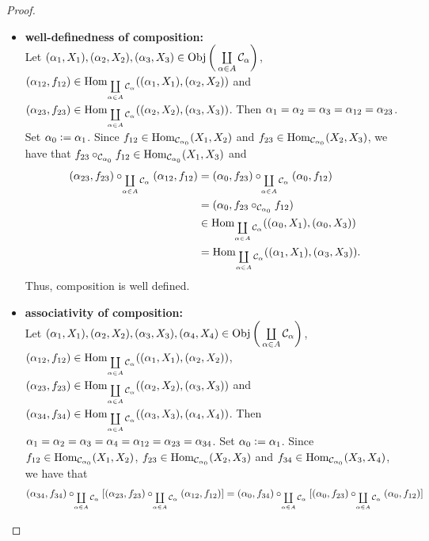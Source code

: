 \documentclass{book}
\begin{document}
	\begin{proof}\
		\begin{itemize}
			\item \textbf{well-definedness of composition: } \\ 
			Let $(\alpha_1, X_1), (\alpha_2, X_2), (\alpha_3, X_3) \in \operatorname{Obj} \bigg( \coprod\limits_{\alpha \in A} \mathcal{C}_{\alpha} \bigg)$, $(\alpha_{12}, f_{12}) \in \operatorname{Hom}_{\coprod\limits_{\alpha \in A} \mathcal{C}_{\alpha}}((\alpha_1, X_1), (\alpha_2, X_2))$ and $(\alpha_{23}, f_{23}) \in \operatorname{Hom}_{\coprod\limits_{\alpha \in A} \mathcal{C}_{\alpha}}((\alpha_2, X_2), (\alpha_3, X_3))$. Then $\alpha_1 = \alpha_2 = \alpha_3 = \alpha_{12} = \alpha_{23}$. Set $\alpha_0 \vcentcolon= \alpha_1$. Since $f_{12} \in \operatorname{Hom}_{\mathcal{C}_{\alpha_0}}(X_1, X_2)$ and $f_{23} \in \operatorname{Hom}_{\mathcal{C}_{\alpha_0}}(X_2, X_3)$, we have that $f_{23} \circ_{\mathcal{C}_{\alpha_0}} f_{12} \in \operatorname{Hom}_{\mathcal{C}_{\alpha_0}}(X_1, X_3)$ and
			\begin{align*}
				(\alpha_{23}, f_{23}) \circ_{\coprod\limits_{\alpha \in A} \mathcal{C}_{\alpha}} (\alpha_{12}, f_{12})
				& = (\alpha_0, f_{23}) \circ_{\coprod\limits_{\alpha \in A} \mathcal{C}_{\alpha}} (\alpha_0, f_{12}) \\
				& = (\alpha_0, f_{23} \circ_{\mathcal{C}_{\alpha_0}} f_{12}) \\
				& \in \operatorname{Hom}_{\coprod\limits_{\alpha \in A} \mathcal{C}_{\alpha}}((\alpha_0, X_1), (\alpha_0, X_3)) \\
				& = \operatorname{Hom}_{\coprod\limits_{\alpha \in A} \mathcal{C}_{\alpha}}((\alpha_1, X_1), (\alpha_3, X_3)).
			\end{align*}  
			Thus, composition is well defined. \\
			\item \textbf{associativity of composition:} \\
			Let $(\alpha_1, X_1), (\alpha_2, X_2), (\alpha_3, X_3), (\alpha_4, X_4) \in \operatorname{Obj} \bigg( \coprod\limits_{\alpha \in A} \mathcal{C}_{\alpha} \bigg)$, $(\alpha_{12}, f_{12}) \in \operatorname{Hom}_{\coprod\limits_{\alpha \in A} \mathcal{C}_{\alpha}}((\alpha_1, X_1), (\alpha_2, X_2))$, $(\alpha_{23}, f_{23}) \in \operatorname{Hom}_{\coprod\limits_{\alpha \in A} \mathcal{C}_{\alpha}}((\alpha_2, X_2), (\alpha_3, X_3))$ and $(\alpha_{34}, f_{34}) \in \operatorname{Hom}_{\coprod\limits_{\alpha \in A} \mathcal{C}_{\alpha}}((\alpha_3, X_3), (\alpha_4, X_4))$. Then $\alpha_1 = \alpha_2 = \alpha_3 = \alpha_4 = \alpha_{12} = \alpha_{23} = \alpha_{34}$. Set $\alpha_0 \vcentcolon= \alpha_1$. Since $f_{12} \in \operatorname{Hom}_{\mathcal{C}_{\alpha_0}}(X_1, X_2)$, $f_{23} \in \operatorname{Hom}_{\mathcal{C}_{\alpha_0}}(X_2, X_3)$ and $f_{34} \in \operatorname{Hom}_{\mathcal{C}_{\alpha_0}}(X_3, X_4)$, we have that 
			\begin{align*}
				(\al_{34}, f_{34}) \circ_{\coprod\limits_{\al \in A} \MC_{\al}} [(\al_{23}, f_{23}) \circ_{\coprod\limits_{\al \in A} \MC_{\al}} (\al_{12}, f_{12})]
				& = (\al_0, f_{34}) \circ_{\coprod\limits_{\al \in A} \MC_{\al}} [(\al_0, f_{23}) \circ_{\coprod\limits_{\al \in A} \MC_{\al}} (\al_0, f_{12})] \\

\end{align*}
\end{itemize}
\end{proof}
\end{document}
